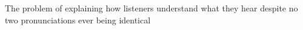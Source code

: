 The problem of explaining how listeners understand what they hear despite no two pronunciations ever being identical

